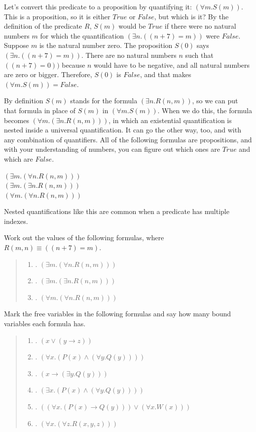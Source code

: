 {{Let's convert this predicate to a proposition by quantifying it:
$(\forall m.S(m))$. This is a proposition, so
it is either $True$ or $False$, but which is it?
By the definition of the predicate $R$,
$S(m)$ would be $True$ if there were no natural numbers $m$
for which the quantification $(\exists n.((n+7) = m))$ were $False$.
Suppose $m$ is the natural number zero.
The proposition $S(0)$ says $(\exists n.((n+7) = m))$.
There are no natural numbers $n$ such that
$((n+7) = 0))$ because $n$ would have to be negative,
and all natural numbers are zero or bigger.
Therefore, $S(0)$ is $False$,
and that makes $(\forall m.S(m)) = False$.

By definition
$S(m)$ stands for the formula $(\exists n.R(n,m))$,
so we can put that formula in place of $S(m)$
in $(\forall m.S(m))$. When we do this,
the formula becomes $(\forall m.(\exists n.R(n,m)))$,
in which an existential quantification
is nested inside a universal quantification.
It can go the other way, too, and with any
combination of quantifiers.
All of the following formulas are propositions,
and with your understanding of numbers, you
can figure out which ones are $True$ and
which are $False$.
\begin{center}
$(\exists m.(\forall n.R(n,m)))$ \\
$(\exists m.(\exists n.R(n,m)))$ \\
$(\forall m.(\forall n.R(n,m)))$
\end{center}
Nested quantifications like this are common
when a predicate has multiple indexes.

\begin{ExerciseList}
\Exercise Work out the values of the following formulas,
where $R(m, n) \equiv ((n + 7) = m)$.
\begin{quote}
\begin{enumerate}[label=\alph*]
\item. $(\exists m.(\forall n.R(n,m)))$
\item. $(\exists m.(\exists n.R(n,m)))$
\item. $(\forall m.(\forall n.R(n,m)))$
\end{enumerate}
\end{quote}

\Exercise
Mark the
free
variables in the following formulas and say how many bound variables
each formula has.
\begin{quote}
\begin{enumerate}[label=\alph*]
\item. $(x \vee (y \rightarrow z))$
\item. $(\forall x.(P(x) \wedge (\forall y.Q(y))))$
\item. $(x \rightarrow (\exists y.Q(y)))$
\item. $(\exists x.(P(x) \wedge (\forall y.Q(y))))$
\item. $((\forall x.(P(x) \rightarrow Q(y))) \vee (\forall x.W(x)))$
\item. $(\forall x. (\forall z.R(x, y, z)))$
\end{enumerate}
\end{quote}


\end{ExerciseList}}}

